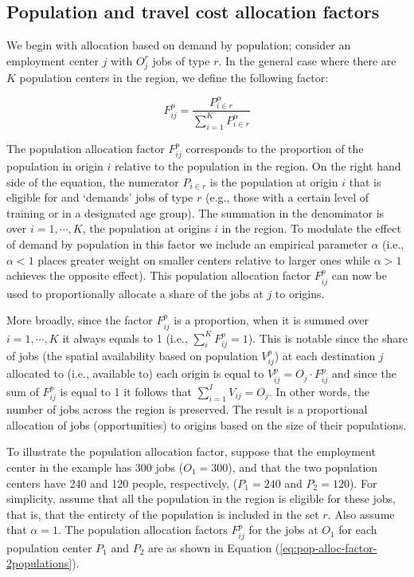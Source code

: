 \documentclass[]{elsarticle} %
\begin{document}
\hypertarget{population-and-travel-cost-allocation-factors}{%
\subsection{Population and travel cost allocation
factors}\label{population-and-travel-cost-allocation-factors}}

We begin with allocation based on demand by population; consider an
employment center \(j\) with \(O_j^r\) jobs of type \(r\). In the
general case where there are \(K\) population centers in the region, we
define the following factor:

\begin{equation}
\label{eq:pop-alloc-factor}
F^p_{ij} = \frac{P_{i\in r}^\alpha}{\sum_{i=1}^K P_{i\in r}^\alpha}
\end{equation}

The population allocation factor \(F^p_{ij}\) corresponds to the
proportion of the population in origin \(i\) relative to the population
in the region. On the right hand side of the equation, the numerator
\(P_{i\in r}\) is the population at origin \(i\) that is eligible for
and `demands' jobs of type \(r\) (e.g., those with a certain level of
training or in a designated age group). The summation in the denominator
is over \(i=1,\cdots,K\), the population at origins \(i\) in the region.
To modulate the effect of demand by population in this factor we include
an empirical parameter \(\alpha\) (i.e., \(\alpha <1\) places greater
weight on smaller centers relative to larger ones while \(\alpha>1\)
achieves the opposite effect). This population allocation factor
\(F^p_{ij}\) can now be used to proportionally allocate a share of the
jobs at \(j\) to origins.

More broadly, since the factor \(F^p_{ij}\) is a proportion, when it is
summed over \(i=1,\cdots,K\) it always equals to 1 (i.e.,
\(\sum_i^{K} F^p_{ij} = 1\)). This is notable since the share of jobs
(the spatial availability based on population \(V^p_{ij}\)) at each
destination \(j\) allocated to (i.e., available to) each origin is equal
to \(V^p_{ij} = O_j \cdot F^p_{ij}\) and since the sum of \(F^p_{ij}\)
is equal to 1 it follows that \(\sum_{i=1}^I V_{ij} = O_j\). In other
words, the number of jobs across the region is preserved. The result is
a proportional allocation of jobs (opportunities) to origins based on
the size of their populations.

To illustrate the population allocation factor, suppose that the
employment center in the example has 300 jobs (\(O_1= 300\)), and that
the two population centers have 240 and 120 people, respectively,
(\(P_1= 240\) and \(P_2 = 120\)). For simplicity, assume that all the
population in the region is eligible for these jobs, that is, that the
entirety of the population is included in the set \(r\). Also assume
that \(\alpha=1\). The population allocation factors \(F^p_{ij}\) for
the jobs at \(O_1\) for each population center \(P_1\) and \(P_2\) are
as shown in Equation (\ref{eq:pop-alloc-factor-2populations}).
\end{document}

